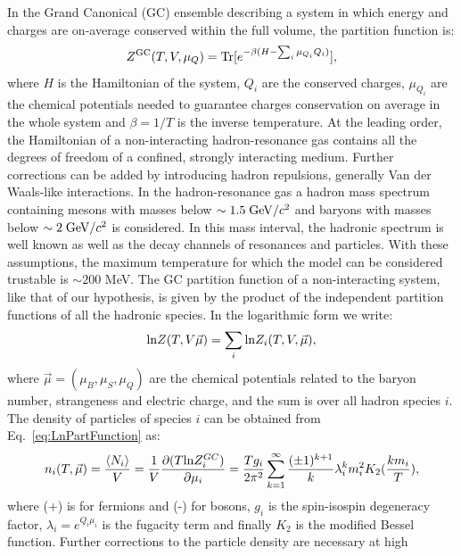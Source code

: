 In the Grand Canonical (GC) ensemble describing a system in which 
energy and charges are on-average conserved within the full volume, the partition function is:
\begin{equation}
  \label{eq:PartitionFunction}
Z^{\rm GC} (T, V, \mu_{Q}) = {\rm Tr}[e^{-\beta(H - \sum_{i}{\mu_{Q_{i}}Q_{i}})}],
\end{equation}
where $H$ is the Hamiltonian of the system, $Q_{i}$ are the conserved charges, 
$\mu_{Q_{i}}$ are the chemical potentials needed to guarantee charges 
conservation on average in the whole system and $\beta = 1/T$ is 
the inverse temperature. At the leading order, the Hamiltonian of a non-interacting 
hadron-resonance gas contains all the degrees of freedom of a 
confined, strongly interacting medium. Further corrections can be added by 
introducing hadron repulsions, generally Van der Waals-like interactions. 
In the hadron-resonance gas a hadron mass 
spectrum containing mesons with masses below $\sim 1.5 \; \mathrm{GeV}/c^{2}$ and 
baryons with masses below $\sim 2\; \mathrm{GeV}/c^{2}$ is considered. In this mass interval, the 
hadronic spectrum is well known as well as the decay channels of resonances 
and particles. With these assumptions, the maximum temperature for which
 the model can be considered trustable is $\sim 200$ MeV. The GC partition 
 function of a non-interacting system, like that of our hypothesis, is given by 
 the product of the independent partition functions of all the hadronic species. 
 In the logarithmic form we write:
\begin{equation}
  \label{eq:LnPartFunction}
{\rm ln} Z(T, V \vec{\mu}) = \sum_{i} {\rm ln} Z_{i} (T, V, \vec{\mu}),
\end{equation}
where $\vec{\mu} = (\mu_B, \mu_S, \mu_Q)$ are the chemical potentials 
related to the baryon number, strangeness and 
electric charge, and the sum is over all hadron species $i$.
The density of particles of species $i$ can be obtained from Eq.~\ref{eq:LnPartFunction} as:
\begin{equation}
\label{eq:ParticleDensity}
n_{i} (T, \vec{\mu}) = \frac{\langle N_{i} \rangle}{V} = \frac{1}{V}\frac{\partial (T {\rm ln}Z_i^{GC})}{\partial \mu_i} = \frac{T g_{i}}{2\pi^{2}} \sum_{k=1}^{\infty} \frac{(\pm 1)^{k+1}}{k} \lambda_{i}^{k} m_{i}^{2}K_{2}(\frac{km_{i}}{T}),
\end{equation}
where (+) is for fermions and (-) for bosons, $g_{i}$ is the spin-isospin 
degeneracy factor, $\lambda_{i} = e^{Q_{i}\mu_{i}}$ is the fugacity 
term and finally $K_{2}$ is the modified Bessel function.
Further corrections to the particle density are necessary at high 
